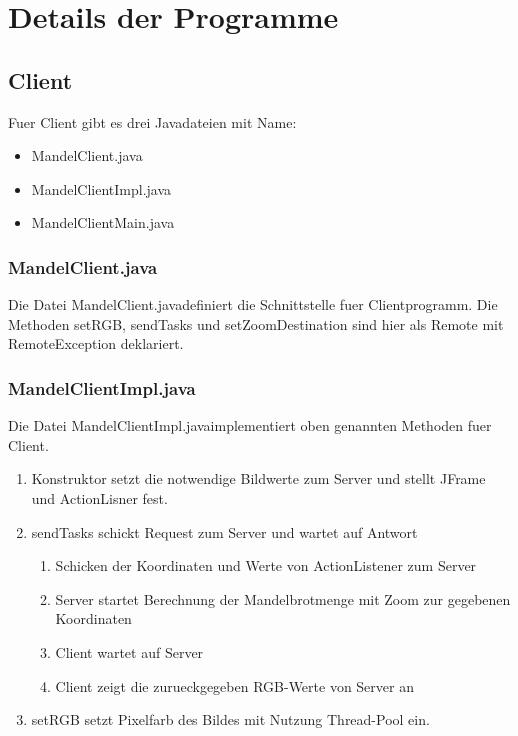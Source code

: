 \documentclass{article}
\begin{document}
\section{Details der Programme}
\subsection{Client}
	Fuer Client gibt es drei Javadateien mit Name:
	\begin{itemize}
		\item MandelClient.java
		\item MandelClientImpl.java
		\item MandelClientMain.java
	\end{itemize}
\subsubsection{MandelClient.java}
	Die Datei \glqq MandelClient.java\grqq definiert die Schnittstelle fuer Clientprogramm. Die Methoden setRGB, sendTasks und setZoomDestination sind hier als Remote mit RemoteException deklariert.
	

	\newpage
\subsubsection{MandelClientImpl.java}
	Die Datei \glqq MandelClientImpl.java\grqq implementiert oben genannten Methoden fuer Client.\\

	\begin{enumerate}
		\item Konstruktor setzt die notwendige Bildwerte zum Server und stellt JFrame und ActionLisner fest.\\
			
			\newpage
		\item sendTasks schickt Request zum Server und wartet auf Antwort\\
			\begin{enumerate}
				\item Schicken der Koordinaten und Werte von ActionListener zum Server
				\item Server startet Berechnung der Mandelbrotmenge mit Zoom zur gegebenen Koordinaten
				\item Client wartet auf Server
				\item Client zeigt die zurueckgegeben RGB-Werte von Server an
			\end{enumerate}
			
		\item setRGB setzt Pixelfarb des Bildes mit Nutzung Thread-Pool ein.
			
	\end{enumerate}
	
\end{document}
